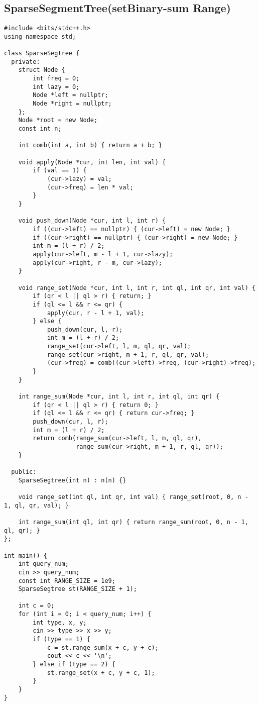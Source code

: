 \subsection{SparseSegmentTree(setBinary-sum Range)}

\begin{lstlisting}[style=cpp]
#include <bits/stdc++.h>
using namespace std;

class SparseSegtree {
  private:
	struct Node {
		int freq = 0;
		int lazy = 0;
		Node *left = nullptr;
		Node *right = nullptr;
	};
	Node *root = new Node;
	const int n;

	int comb(int a, int b) { return a + b; }

	void apply(Node *cur, int len, int val) {
		if (val == 1) {
			(cur->lazy) = val;
			(cur->freq) = len * val;
		}
	}

	void push_down(Node *cur, int l, int r) {
		if ((cur->left) == nullptr) { (cur->left) = new Node; }
		if ((cur->right) == nullptr) { (cur->right) = new Node; }
		int m = (l + r) / 2;
		apply(cur->left, m - l + 1, cur->lazy);
		apply(cur->right, r - m, cur->lazy);
	}

	void range_set(Node *cur, int l, int r, int ql, int qr, int val) {
		if (qr < l || ql > r) { return; }
		if (ql <= l && r <= qr) {
			apply(cur, r - l + 1, val);
		} else {
			push_down(cur, l, r);
			int m = (l + r) / 2;
			range_set(cur->left, l, m, ql, qr, val);
			range_set(cur->right, m + 1, r, ql, qr, val);
			(cur->freq) = comb((cur->left)->freq, (cur->right)->freq);
		}
	}

	int range_sum(Node *cur, int l, int r, int ql, int qr) {
		if (qr < l || ql > r) { return 0; }
		if (ql <= l && r <= qr) { return cur->freq; }
		push_down(cur, l, r);
		int m = (l + r) / 2;
		return comb(range_sum(cur->left, l, m, ql, qr),
		            range_sum(cur->right, m + 1, r, ql, qr));
	}

  public:
	SparseSegtree(int n) : n(n) {}

	void range_set(int ql, int qr, int val) { range_set(root, 0, n - 1, ql, qr, val); }

	int range_sum(int ql, int qr) { return range_sum(root, 0, n - 1, ql, qr); }
};

int main() {
	int query_num;
	cin >> query_num;
	const int RANGE_SIZE = 1e9;
	SparseSegtree st(RANGE_SIZE + 1);

	int c = 0;
	for (int i = 0; i < query_num; i++) {
		int type, x, y;
		cin >> type >> x >> y;
		if (type == 1) {
			c = st.range_sum(x + c, y + c);
			cout << c << '\n';
		} else if (type == 2) {
			st.range_set(x + c, y + c, 1);
		}
	}
}
\end{lstlisting}

